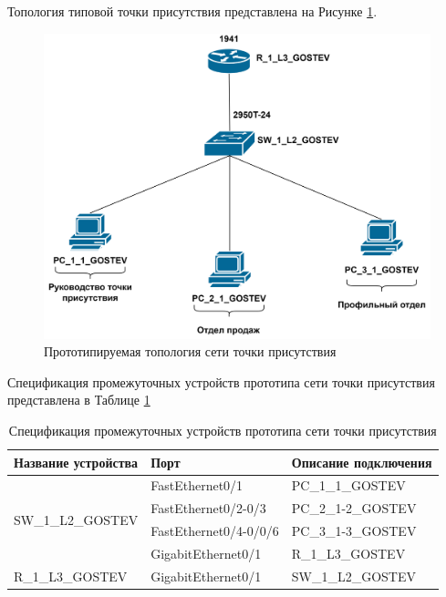 \documentclass[14pt, a4paper]{extarticle}
\numberwithin{equation}{section}
\begin{document}
Топология типовой точки присутствия представлена на Рисунке \ref{fig:tpTopo}.
\begin{figure}[H]
        \centering
        \includegraphics[scale=0.2]{topo_tp.png}
        \caption{Прототипируемая топология сети точки присутствия}
        \label{fig:tpTopo}
\end{figure}

Спецификация промежуточных устройств прототипа сети точки присутствия
представлена в Таблице \ref{table:tpDevicesSpecs}
\begin{table}[H]
\small
\centering
\caption{Спецификация промежуточных устройств прототипа сети точки присутствия}
\label{table:tpDevicesSpecs}
\begin{tabular}{|l|l|l|}
\hline
\textbf{Название устройства}       & \textbf{Порт}         & \textbf{Описание подключения} \\ \hline
\multirow{4}{*}{SW\_1\_L2\_GOSTEV} & FastEthernet0/1       & PC\_1\_1\_GOSTEV              \\ \cline{2-3} 
                                   & FastEthernet0/2-0/3   & PC\_2\_1-2\_GOSTEV        \\ \cline{2-3} 
                                   & FastEthernet0/4-0/0/6 & PC\_3\_1-3\_GOSTEV            \\ \cline{2-3} 
                                   & GigabitEthernet0/1    & R\_1\_L3\_GOSTEV              \\ \hline
R\_1\_L3\_GOSTEV                   & GigabitEthernet0/1    & SW\_1\_L2\_GOSTEV             \\ \hline
\end{tabular}
\end{table}
\end{document}
